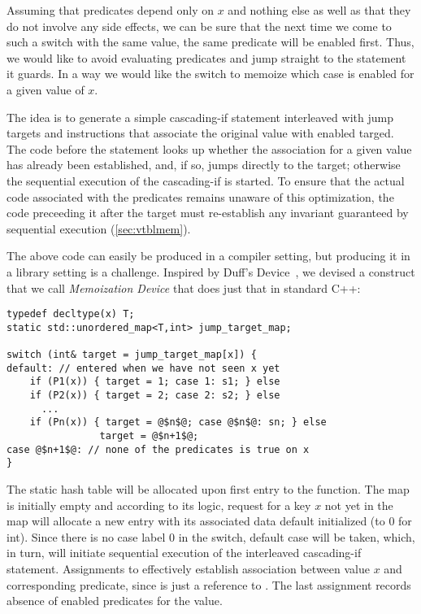 \noindent
Assuming that predicates depend only on $x$ and nothing else as well as that 
they do not involve any side effects, we can be sure that the next time we come 
to such a switch with the same value, the same predicate will be enabled 
first. Thus, we would like to avoid evaluating predicates and jump straight to 
the statement it guards. In a way we would like the switch to  memoize which 
case is enabled for a given value of $x$.

The idea is to generate a simple cascading-if statement interleaved with jump 
targets and instructions that associate the original value with enabled targed. 
The code before the statement looks up whether the association for a given value 
has already been established, and, if so, jumps directly to the target; otherwise 
the sequential execution of the cascading-if is started. To ensure 
that the actual code associated with the predicates remains unaware of this 
optimization, the code preceeding it after the target must re-establish any 
invariant guaranteed by sequential execution (\textsection\ref{sec:vtblmem}).

The above code can easily be produced in a compiler setting, but producing it in 
a library setting is a challenge. Inspired by Duff's Device~\cite{Duff}, 
we devised a construct that we call \emph{Memoization Device} that does just 
that in standard C++:

\begin{lstlisting}
typedef decltype(x) T;
static std::unordered_map<T,int> jump_target_map;

switch (int& target = jump_target_map[x]) {
default: // entered when we have not seen x yet
    if (P1(x)) { target = 1; case 1: s1; } else 
    if (P2(x)) { target = 2; case 2: s2; } else
      ...
    if (Pn(x)) { target = @$n$@; case @$n$@: sn; } else
                target = @$n+1$@;
case @$n+1$@: // none of the predicates is true on x
}
\end{lstlisting}

\noindent
The static  hash table will be allocated upon first entry 
to the function. The map is initially empty and according to its logic, 
request for a key $x$ not yet in the map will allocate a 
new entry with its associated data default initialized (to 0 for int). Since 
there is no case label 0 in the switch, default case will be taken, which, in 
turn, will initiate sequential execution of the interleaved cascading-if 
statement. Assignments to  effectively establish association 
between value $x$ and corresponding predicate, since  is just a 
reference to . The last assignment records absence of 
enabled predicates for the value.

